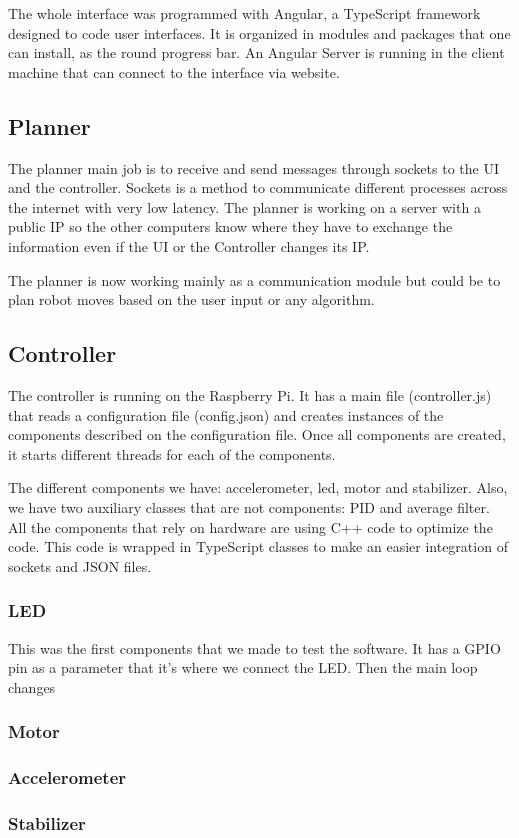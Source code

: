 The whole interface was programmed with Angular, a TypeScript framework designed to code user interfaces.
It is organized in modules and packages that one can install, as the round progress bar. An Angular Server is 
running in the client machine that can connect to the interface via website.

\subsection{Planner}
The planner main job is to receive and send messages through sockets to the UI and the controller. Sockets is a method to communicate
different processes across the internet with very low latency. The planner is working on a server with a public IP
so the other computers know where they have to exchange the information even if the UI or the Controller changes its IP.

The planner is now working mainly as a communication module but could be to plan robot moves based on the user input or
any algorithm.

\subsection{Controller}
The controller is running on the Raspberry Pi. It has a main file (controller.js) that reads
a configuration file (config.json) and creates instances of the components described on the configuration file.
Once all components are created, it starts different threads for each of the components.

The different components we have: accelerometer, led, motor and stabilizer. Also, we have two auxiliary classes that are
not components: PID and average filter. All the components that rely on hardware are using C++ code to optimize
the code. This code is wrapped in TypeScript classes to make an easier integration of sockets and JSON files.

\subsubsection{LED}
This was the first components that we made to test the software.
It has a GPIO pin as a parameter that it's where we connect the LED.
Then the main loop changes 
\subsubsection{Motor}
\subsubsection{Accelerometer}
\subsubsection{Stabilizer}